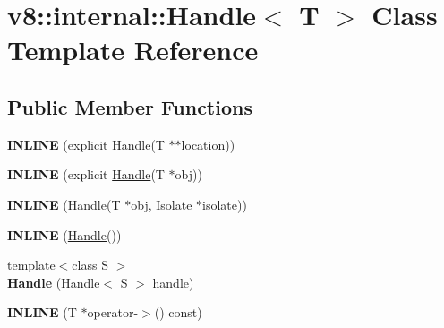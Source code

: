 \hypertarget{classv8_1_1internal_1_1_handle}{}\section{v8\+:\+:internal\+:\+:Handle$<$ T $>$ Class Template Reference}
\label{classv8_1_1internal_1_1_handle}
\subsection*{Public Member Functions}
\begin{DoxyCompactItemize}
\item 
\hypertarget{classv8_1_1internal_1_1_handle_a2c87544db649ad86bd007cbc8c002b15}{}{\bfseries I\+N\+L\+I\+N\+E} (explicit \hyperlink{classv8_1_1internal_1_1_handle}{Handle}(T $\ast$$\ast$location))\label{classv8_1_1internal_1_1_handle_a2c87544db649ad86bd007cbc8c002b15}

\item 
\hypertarget{classv8_1_1internal_1_1_handle_aca0387a42ca8c0a82cb5b07cf97e394d}{}{\bfseries I\+N\+L\+I\+N\+E} (explicit \hyperlink{classv8_1_1internal_1_1_handle}{Handle}(T $\ast$obj))\label{classv8_1_1internal_1_1_handle_aca0387a42ca8c0a82cb5b07cf97e394d}

\item 
\hypertarget{classv8_1_1internal_1_1_handle_a2ac02a8e0b0e0363d5df75cefae815fe}{}{\bfseries I\+N\+L\+I\+N\+E} (\hyperlink{classv8_1_1internal_1_1_handle}{Handle}(T $\ast$obj, \hyperlink{classv8_1_1internal_1_1_isolate}{Isolate} $\ast$isolate))\label{classv8_1_1internal_1_1_handle_a2ac02a8e0b0e0363d5df75cefae815fe}

\item 
\hypertarget{classv8_1_1internal_1_1_handle_aea4a84d53f4af711671f40d69975a1ab}{}{\bfseries I\+N\+L\+I\+N\+E} (\hyperlink{classv8_1_1internal_1_1_handle}{Handle}())\label{classv8_1_1internal_1_1_handle_aea4a84d53f4af711671f40d69975a1ab}

\item 
\hypertarget{classv8_1_1internal_1_1_handle_a906383198d18756576955b6edf0ea26b}{}{\footnotesize template$<$class S $>$ }\\{\bfseries Handle} (\hyperlink{classv8_1_1internal_1_1_handle}{Handle}$<$ S $>$ handle)\label{classv8_1_1internal_1_1_handle_a906383198d18756576955b6edf0ea26b}

\item 
\hypertarget{classv8_1_1internal_1_1_handle_ac11c73d6b99ab19be0b78fbea6be8d80}{}{\bfseries I\+N\+L\+I\+N\+E} (T $\ast$operator-\/$>$() const)\label{classv8_1_1internal_1_1_handle_ac11c73d6b99ab19be0b78fbea6be8d80}


\end{DoxyCompactItemize}
